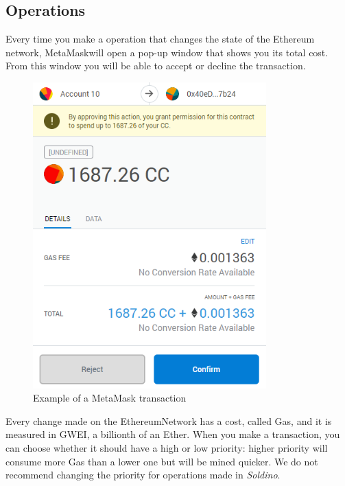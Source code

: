 	\subsection{Operations}
	Every time you make a operation that changes the state of the Ethereum\glosp 
	network, MetaMask\glosp will open a pop-up window that shows you its total cost.
	From this window you will be able to accept or decline the transaction.\\
	\begin{figure}[H]
		\includegraphics[width=9cm]{res/images/metamask_transaction.png}
		\centering
		\caption{Example of a MetaMask transaction}
	\end{figure}
	\noindent 
	Every change made on the Ethereum\glosp Network has a cost, called 
	Gas\glo{}, and it is measured in GWEI, a billionth of an Ether\glo. When you 
	make a transaction, you can choose whether it should have a high or low 
	priority: higher priority will consume more Gas than a lower one but will 
	be mined quicker. We do not recommend changing the priority for 
	operations made in \textit{Soldino}.
